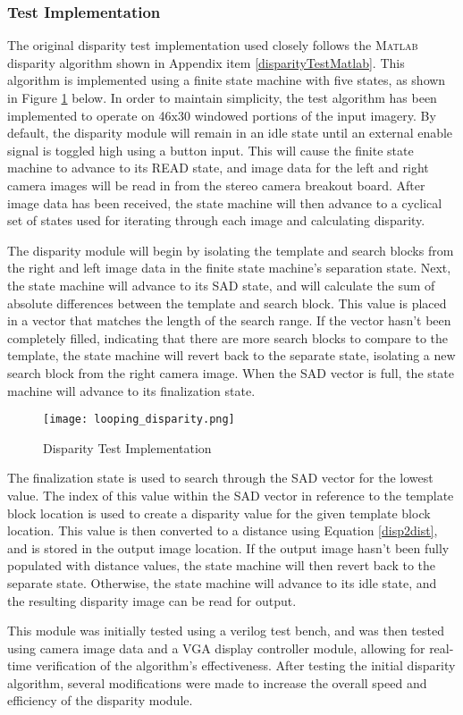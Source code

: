\subsubsection{Test Implementation}
The original disparity test implementation used closely follows the \textsc{Matlab} disparity algorithm shown in Appendix item \ref{disparityTestMatlab}. This algorithm is implemented using a finite state machine with five states, as shown in Figure \ref{disparityTestImp} below. In order to maintain simplicity, the test algorithm has been implemented to operate on 46x30 windowed portions of the input imagery. By default, the disparity module will remain in an idle state until an external enable signal is toggled high using a button input. This will cause the finite state machine to advance to its READ state, and image data for the left and right camera images will be read in from the stereo camera breakout board. After image data has been received, the state machine will then advance to a cyclical set of states used for iterating through each image and calculating disparity. 
\par
The disparity module will begin by isolating the template and search blocks from the right and left image data in the finite state machine's separation state. Next, the state machine will advance to its SAD state, and will calculate the sum of absolute differences between the template and search block. This value is placed in a vector that matches the length of the search range. If the vector hasn't been completely filled, indicating that there are more search blocks to compare to the template, the state machine will revert back to the separate state, isolating a new search block from the right camera image. When the SAD vector is full, the state machine will advance to its finalization state. 
\par
\begin{figure}[H]
	\centerline{\texttt{[image: looping\_disparity.png]}}
	\caption{Disparity Test Implementation}
	\label{disparityTestImp}
\end{figure}
\par
The finalization state is used to search through the SAD vector for the lowest value. The index of this value within the SAD vector in reference to the template block location is used to create a disparity value for the given template block location. This value is then converted to a distance using Equation \ref{disp2dist}, and is stored in the output image location. If the output image hasn't been fully populated with distance values, the state machine will then revert back to the separate state. Otherwise, the state machine will advance to its idle state, and the resulting disparity image can be read for output. 
\par
This module was initially tested using a verilog test bench, and was then tested using camera image data and a VGA display controller module, allowing for real-time verification of the algorithm's effectiveness. After testing the initial disparity algorithm, several modifications were made to increase the overall speed and efficiency of the disparity module. 


